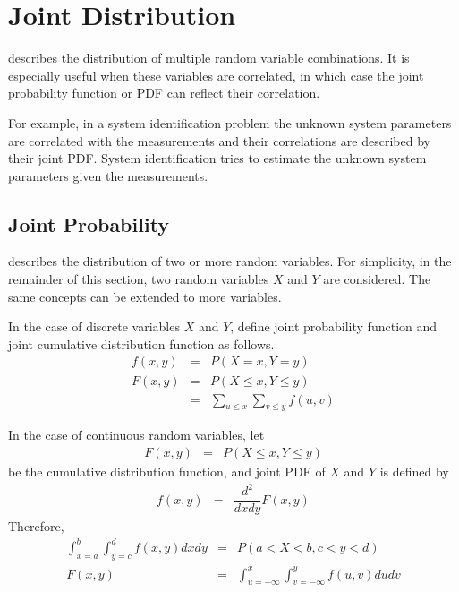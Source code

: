 \section{Joint Distribution}

 describes the distribution of multiple random variable combinations. It is especially useful when these variables are correlated, in which case the joint probability function or PDF can reflect their correlation. 

For example, in a system identification problem the unknown system parameters are correlated with the measurements and their correlations are described by their joint PDF. System identification tries to estimate the unknown system parameters given the measurements.

\subsection{Joint Probability}

 describes the distribution of two or more random variables. For simplicity, in the remainder of this section, two random variables $X$ and $Y$ are considered. The same concepts can be extended to more variables.

In the case of discrete variables $X$ and $Y$, define joint probability function and joint cumulative distribution function as follows.
\begin{eqnarray}
  f(x, y) &=& P\left(X=x, Y=y\right) \nonumber \\
  F(x, y) &=& P\left(X\leq x, Y\leq y\right) \nonumber \\
  &=& \sum_{u\leq x}\sum_{v\leq y}f(u, v) \nonumber
\end{eqnarray}

In the case of continuous random variables, let
\begin{eqnarray}
  F(x, y) &=& P(X \leq x, Y \leq y) \nonumber
\end{eqnarray}
be the cumulative distribution function, and joint PDF of $X$ and $Y$ is defined by
\begin{eqnarray}
	f(x, y) &=& \dfrac{d^2}{dxdy}F(x, y) \nonumber
\end{eqnarray}
Therefore,
\begin{eqnarray}
  \int_{x=a}^{b}\int_{y=c}^{d} f(x, y) dxdy &=& P\left(a < X < b, c < y < d \right) \label{eq:jointpdf} \\
  F(x, y) &=& \int_{u=-\infty}^{x}\int_{v=-\infty}^{y}f(u, v)dudv \nonumber
\end{eqnarray}

